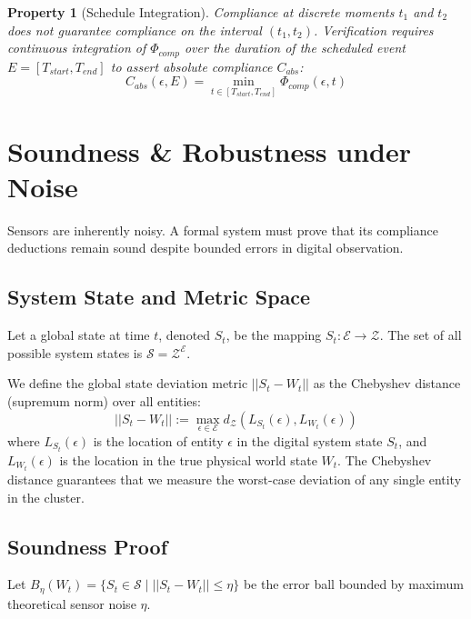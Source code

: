 \documentclass[conference]{IEEEtran}
\newtheorem{property}{Property}
\newcommand{\E}{\mathcal{E}} %
\newcommand{\Z}{\mathcal{Z}} %
\newcommand{\Sstate}{\mathcal{S}} %
\begin{document}
\begin{property}[Schedule Integration]
Compliance at discrete moments $t_1$ and $t_2$ does not guarantee compliance on the interval $(t_1, t_2)$. Verification requires continuous integration of $\Phi_{comp}$ over the duration of the scheduled event $E = [T_{start}, T_{end}]$ to assert absolute compliance $C_{abs}$:
\begin{equation}
C_{abs}(\epsilon, E) = \min_{t \in [T_{start}, T_{end}]} \Phi_{comp}(\epsilon, t)
\end{equation}
\end{property}

\section{Soundness \& Robustness under Noise}

Sensors are inherently noisy. A formal system must prove that its compliance deductions remain sound despite bounded errors in digital observation.

\subsection{System State and Metric Space}
Let a global state at time $t$, denoted $S_t$, be the mapping $S_t: \E \to \Z$. The set of all possible system states is $\Sstate = \Z^\E$.

We define the global state deviation metric $||S_t - W_t||$ as the Chebyshev distance (supremum norm) over all entities:
\begin{equation}
||S_t - W_t|| := \max_{\epsilon \in \E} d_\Z(L_{S_t}(\epsilon), L_{W_t}(\epsilon))
\end{equation}
where $L_{S_t}(\epsilon)$ is the location of entity $\epsilon$ in the digital system state $S_t$, and $L_{W_t}(\epsilon)$ is the location in the true physical world state $W_t$. The Chebyshev distance guarantees that we measure the worst-case deviation of any single entity in the cluster.

\subsection{Soundness Proof}
Let $B_\eta(W_t) = \{ S_t \in \Sstate \mid ||S_t - W_t|| \le \eta \}$ be the error ball bounded by maximum theoretical sensor noise $\eta$.
\end{document}
